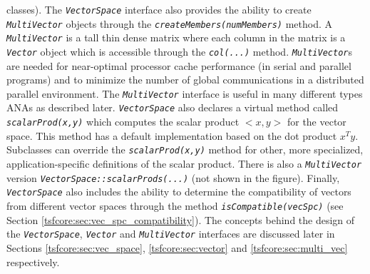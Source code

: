 classes).  The {}\texttt{\textit{VectorSpace}} interface also provides
the ability to create {}\texttt{\textit{Multi\-Vector}} objects
through the {}\texttt{\textit{createMembers(numMembers)}} method.  A
{}\texttt{\textit{Multi\-Vector}} is a tall thin dense matrix where
each column in the matrix is a {}\texttt{\textit{Vector}} object which
is accessible through the {}\texttt{\textit{col(...)}} method.
{}\texttt{\textit{Multi\-Vector}}s are needed for near-optimal
processor cache performance (in serial and parallel programs) and to
minimize the number of global communications in a distributed parallel
environment.  The {}\texttt{\textit{Multi\-Vector}} interface is
useful in many different types ANAs as described
later. {}\texttt{\textit{VectorSpace}} also declares a virtual method
called {}\texttt{\textit{scalarProd(x,y)}} which computes the scalar
product $<x,y>$ for the vector space. This method has a default
implementation based on the dot product $x^T y$.  Subclasses can
override the {}\texttt{\textit{scalarProd(x,y)}} method for other,
more specialized, application-specific definitions of the scalar
product. There is also a {}\texttt{\textit{Multi\-Vector}} version
{}\texttt{\textit{VectorSpace\-::scalarProds(...)}} (not shown in the
figure).  Finally, {}\texttt{\textit{VectorSpace}} also includes the
ability to determine the compatibility of vectors from different
vector spaces through the method
{}\texttt{\textit{isCompatible(vecSpc)}} (see Section
{}\ref{tsfcore:sec:vec_spc_compatibility}).  The concepts behind the
design of the {}\texttt{\textit{VectorSpace}},
{}\texttt{\textit{Vector}} and {}\texttt{\textit{Multi\-Vector}}
interfaces are discussed later in Sections
{}\ref{tsfcore:sec:vec_space}, {}\ref{tsfcore:sec:vector} and
{}\ref{tsfcore:sec:multi_vec} respectively.


